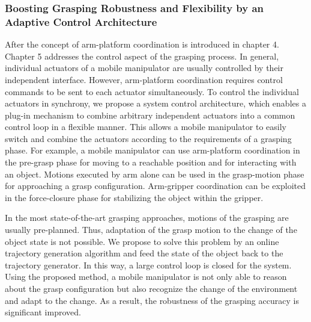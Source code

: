 \subsubsection{Boosting Grasping Robustness and Flexibility by an Adaptive Control Architecture}
After the concept of arm-platform coordination is introduced in chapter 4. Chapter 5 addresses the control aspect of the grasping process. In general, individual actuators of a mobile manipulator are usually controlled by their independent interface. However, arm-platform coordination requires control commands to be sent to each actuator simultaneously. To control the individual actuators in synchrony, we propose a system control architecture, which enables a plug-in mechanism to combine arbitrary independent actuators into a common control loop in a flexible manner. This allows a mobile manipulator to easily switch and combine the actuators according to the requirements of a grasping phase. For example, a mobile manipulator can use arm-platform coordination in the pre-grasp phase for moving to a reachable position and for interacting with an object. Motions executed by arm alone can be used in the grasp-motion phase for approaching a grasp configuration. Arm-gripper coordination can be exploited in the force-closure phase for stabilizing the object within the gripper. 

In the most state-of-the-art grasping approaches, motions of the grasping are usually pre-planned. Thus, adaptation of the grasp motion to the change of the object state is not possible. We propose to solve this problem by an online trajectory generation algorithm and feed the state of the object back to the trajectory generator. In this way, a large control loop is closed for the system. Using the proposed method, a mobile manipulator is not only able to reason about the grasp configuration  but also recognize the change of the environment and adapt to the change. As a result, the robustness of the grasping accuracy is significant improved. 

 

